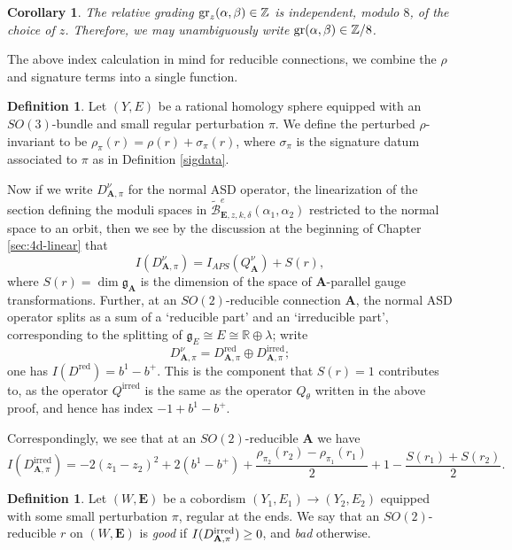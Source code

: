 \documentclass[10pt,a4paper]{amsart}
\newtheorem{corollary}[theorem]{Corollary}
\theoremstyle{definition}
\newtheorem{definition}[theorem]{Definition}
\theoremstyle{remark}
\numberwithin{figure}{qchap}
\begin{document}
\begin{corollary}\label{gr-mod-8}The relative grading $\textup{gr}_z(\alpha, \beta) \in \mathbb Z$ is independent, modulo $8$, of the choice of $z$. Therefore, we may unambiguously write $\textup{gr}(\alpha, \beta) \in \mathbb Z/8$.
\end{corollary}

The above index calculation in mind for reducible connections, we combine the $\rho$ and signature terms into a single function.

\begin{definition}Let $(Y,E)$ be a rational homology sphere equipped with an $SO(3)$-bundle and small regular perturbation $\pi$. We define the perturbed $\rho$-invariant to be $\rho_\pi(r) = \rho(r) + \sigma_\pi(r)$, where $\sigma_\pi$ is the signature datum associated to $\pi$ as in Definition \ref{sigdata}.
\end{definition}

Now if we write $D^\nu_{\mathbf{A},\pi}$ for the normal ASD operator, the linearization of the section defining the moduli spaces in $\widetilde{\mathcal B}^{e}_{\mathbf{E},z,k,\delta}(\alpha_1, \alpha_2)$ restricted to the normal space to an orbit, then we see by the discussion at the beginning of Chapter \ref{sec:4d-linear} that 
$$I(D^\nu_{\mathbf{A},\pi}) = I_{APS}(Q_{\mathbf{A}}^\nu) + S(r),$$ 
where $S(r) = \dim \mathfrak{g}_{\mathbf{A}}$ is the dimension of the space of $\mathbf{A}$-parallel gauge transformations. Further, at an $SO(2)$-reducible connection $\mathbf{A}$, the normal ASD operator splits as a sum of a `reducible part' and an `irreducible part', corresponding to the splitting of $\mathfrak g_E \cong E \cong \mathbb R \oplus \lambda$; write 
$$D^\nu_{\mathbf{A},\pi} = D_{\mathbf{A},\pi}^{\text{red}} \oplus D^{\text{irred}}_{\mathbf{A},\pi};$$ 
one has $I(D^\text{red}) = b^1 - b^+$. This is the component that $S(r) = 1$ contributes to, as the operator $Q^{\text{irred}}$ is the same as the operator $Q_\theta$ written in the above proof, and hence has index $-1+b^1 - b^+$. 

Correspondingly, we see that at an $SO(2)$-reducible $\mathbf{A}$ we have $$I(D^{\text{irred}}_{\mathbf{A},\pi}) = -2(z_1 - z_2)^2 +2(b^1-b^+) + \frac{\rho_{\pi_2}(r_2) - \rho_{\pi_1}(r_1)}{2} + 1 - \frac{S(r_1) + S(r_2)}{2}.$$ 

\begin{definition}\label{badred}Let $(W,\mathbf{E})$ be a cobordism $(Y_1, E_1) \to (Y_2, E_2)$ equipped with some small perturbation $\pi$, regular at the ends. We say that an $SO(2)$-reducible $r$ on $(W,\mathbf{E})$ is \emph{good} if $I(D^{\textup{irred}}_{\mathbf{A},\pi}) \geq 0$, and \emph{bad} otherwise.
\end{definition}
\end{document}
